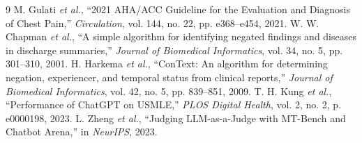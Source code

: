 \documentclass[11pt,a4paper]{article}
\begin{document}
\begin{thebibliography}{9}
M. Gulati \textit{et al.}, ``2021 AHA/ACC Guideline for the Evaluation and Diagnosis of Chest Pain,'' \textit{Circulation}, vol. 144, no. 22, pp. e368--e454, 2021.
W. W. Chapman \textit{et al.}, ``A simple algorithm for identifying negated findings and diseases in discharge summaries,'' \textit{Journal of Biomedical Informatics}, vol. 34, no. 5, pp. 301--310, 2001.
H. Harkema \textit{et al.}, ``ConText: An algorithm for determining negation, experiencer, and temporal status from clinical reports,'' \textit{Journal of Biomedical Informatics}, vol. 42, no. 5, pp. 839--851, 2009.
T. H. Kung \textit{et al.}, ``Performance of ChatGPT on USMLE,'' \textit{PLOS Digital Health}, vol. 2, no. 2, p. e0000198, 2023.
L. Zheng \textit{et al.}, ``Judging LLM-as-a-Judge with MT-Bench and Chatbot Arena,'' in \textit{NeurIPS}, 2023.
\end{thebibliography}
\end{document}
